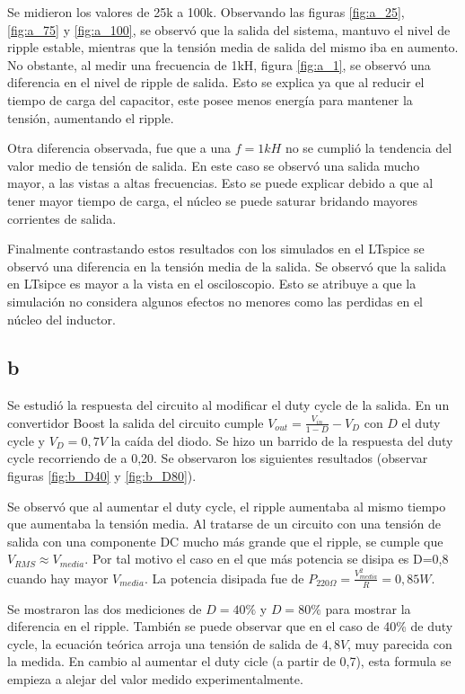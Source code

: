 Se midieron los valores de 25k a 100k. Observando las figuras \ref{fig:a_25}, \ref{fig:a_75} y \ref{fig:a_100}, se observó que la salida del sistema, mantuvo el nivel de ripple estable, mientras que la tensión media de salida del mismo iba en aumento. No obstante, al medir una frecuencia de 1kH, figura \ref{fig:a_1}, se observó una diferencia en el nivel de ripple de salida. Esto se explica ya que al reducir el tiempo de carga del capacitor, este posee menos energía para mantener la tensión, aumentando el ripple. \par
Otra diferencia observada, fue que a una $f = 1kH$ no se cumplió la tendencia del valor medio de tensión de salida. En este caso se observó una salida mucho mayor, a las vistas a altas frecuencias. Esto se puede explicar debido a que al tener mayor tiempo de carga, el núcleo se puede saturar bridando mayores corrientes de salida.\par

Finalmente contrastando estos resultados con los simulados en el LTspice se observó una diferencia en la tensión media de la salida. Se observó que la salida en LTsipce es mayor a la vista en el osciloscopio. Esto se atribuye a que la simulación no considera algunos efectos no menores como las perdidas en el núcleo del inductor.

\subsection{b}

Se estudió la respuesta del circuito al modificar el duty cycle de la salida. En un convertidor Boost la salida del circuito cumple $V_{out} = \frac{V_{in}}{1-D} - V_D$ con $D$ el duty cycle y $V_D = 0,7V$ la caída del diodo. Se hizo un barrido de la respuesta del duty cycle recorriendo de a 0,20. Se observaron los siguientes resultados (observar figuras \ref{fig:b_D40} y          \ref{fig:b_D80}). \par

Se observó que al aumentar el duty cycle, el ripple aumentaba al mismo tiempo que aumentaba la tensión media. Al tratarse de un circuito con una tensión de salida con una componente DC mucho más grande que el ripple, se cumple que $V_{RMS} \approx V_{media}$. Por tal motivo el caso en el que más potencia se disipa es D=0,8 cuando hay mayor $V_{media}$. La potencia disipada fue de $P_{220\Omega}= \frac{V_{media}^2}{R} = 0,85W$.\par

Se mostraron las dos mediciones de $D= 40\%$ y $D=80\%$ para mostrar la diferencia en el ripple. También se puede observar que en el caso de 40\% de duty cycle, la ecuación teórica arroja una tensión de salida de $4,8 V$, muy parecida con la medida. En cambio al aumentar el duty cicle (a partir de 0,7), esta formula se empieza a alejar del valor medido experimentalmente.
